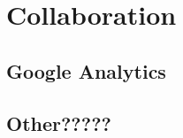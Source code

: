 \chapter{Collaboration}\label{chap:collaboration}

\section{Google Analytics}


\section{Other?????}